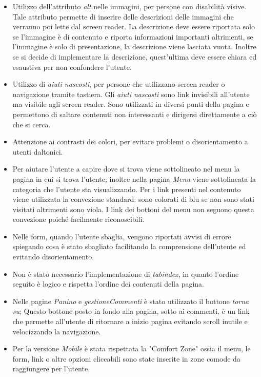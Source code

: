 	\begin{itemize}
		\item Utilizzo dell'attributo \emph{alt} nelle immagini, per persone con disabilità visive.
		 Tale attributo permette di inserire delle descrizioni delle immagini che verranno poi lette dal screen reader. 
		 La descrizione deve essere riportata solo se l'immagine è di contenuto e riporta informazioni importanti altrimenti, se l'immagine è solo di presentazione, la descrizione viene lasciata vuota.
		 Inoltre se si decide di implementare la descrizione, quest'ultima deve essere chiara ed esaustiva per non confondere l'utente.
		\item Utilizzo di \emph{aiuti nascosti}, per persone che utilizzano screen reader o navigazione tramite tastiera. 
		Gli \emph{aiuti nascosti} sono link invisibili all'utente ma visibile agli screen reader.
		 Sono utilizzati in diversi punti della pagina e permettono di saltare contenuti non interessanti e dirigersi direttamente a ciò che si cerca.
		\item Attenzione ai contrasti dei colori, per evitare problemi o disorientamento a utenti daltonici. 
		\item Per aiutare l'utente a capire dove si trova viene sottolineato nel menu la pagina in cui si trova l'utente; inoltre nella pagina \emph{Menu} viene sottolineata la categoria che l'utente sta visualizzando.
		Per i link presenti nel contenuto viene utilizzata la convezione standard: sono colorati di blu se non sono stati visitati altrimenti sono viola.
		I link dei bottoni del menu non seguono questa convezione poiché facilmente riconoscibili.
		\item Nelle form, quando l'utente sbaglia, vengono riportati avvisi di errore spiegando cosa è stato sbagliato facilitando la comprensione dell'utente ed evitando disorientamento.
		\item Non è stato necessario l'implementazione di \emph{tabindex}, in quanto l'ordine seguito è logico e rispetta l'ordine dei contenuti della pagina. %
		\item Nelle pagine \emph{Panino} e \emph{gestioneCommenti} è stato utilizzato il bottone \emph{torna su}; Questo bottone posto in fondo alla pagina, sotto ai commenti, è un link che permette all'utente di ritornare a inizio pagina evitando scroll inutile e velocizzando la navigazione. 
		\item Per la versione \emph{Mobile} è stata rispettata la "Comfort Zone" ossia il menu, le form, link o altre opzioni cliccabili sono state inserite in zone comode da raggiungere per l'utente. 
	\end{itemize}